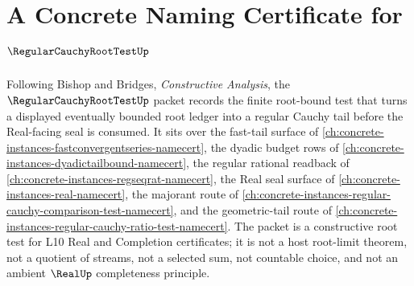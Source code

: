 \chapter{A Concrete Naming Certificate for $\RegularCauchyRootTestUp$}
\label{ch:concrete-instances-regular-cauchy-root-test-namecert}

Following Bishop and Bridges, \emph{Constructive Analysis}, the $\RegularCauchyRootTestUp$ packet records the finite root-bound test that turns a displayed eventually bounded root ledger into a regular Cauchy tail before the Real-facing seal is consumed. It sits over the fast-tail surface of \autoref{ch:concrete-instances-fastconvergentseries-namecert}, the dyadic budget rows of \autoref{ch:concrete-instances-dyadictailbound-namecert}, the regular rational readback of \autoref{ch:concrete-instances-regseqrat-namecert}, the Real seal surface of \autoref{ch:concrete-instances-real-namecert}, the majorant route of \autoref{ch:concrete-instances-regular-cauchy-comparison-test-namecert}, and the geometric-tail route of \autoref{ch:concrete-instances-regular-cauchy-ratio-test-namecert}. The packet is a constructive root test for L10 Real and Completion certificates; it is not a host root-limit theorem, not a quotient of streams, not a selected sum, not countable choice, and not an ambient $\RealUp$ completeness principle.

